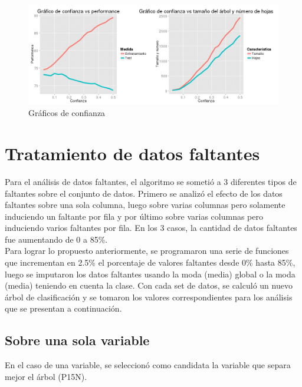 \documentclass[]{article}
\begin{document}
\begin{figure}[H]
	\includegraphics[scale = 0.4]{1_3_Conf_Perf_Num}
	\caption[Confianza vs ajuste]{Gráficos de confianza}
	\label{1.P1Conf}
\end{figure}
%
%






\section{Tratamiento de datos faltantes}
Para el análisis de datos faltantes, el algoritmo se sometió a 3 diferentes tipos de faltantes sobre el conjunto de datos. Primero se analizó el efecto de los datos faltantes sobre una sola columna, luego sobre varias columnas pero solamente induciendo un faltante por fila y por último sobre varias columnas pero induciendo varios faltantes por fila. En los 3 casos, la cantidad de datos faltantes fue aumentando de 0 a 85\%.\\
Para lograr lo propuesto anteriormente, se programaron una serie de funciones que incrementan en 2.5\% el porcentaje de valores faltantes desde 0\% hasta 85\%, luego se imputaron los datos faltantes usando la moda (media) global o la moda (media) teniendo en cuenta la clase. Con cada set de datos, se calculó un nuevo árbol de clasificación y se tomaron los valores correspondientes para los análisis que se presentan a continuación.

\subsection{Sobre una sola variable}
En el caso de una variable, se seleccionó como candidata la variable que separa mejor el árbol (P15N).
\end{document}
